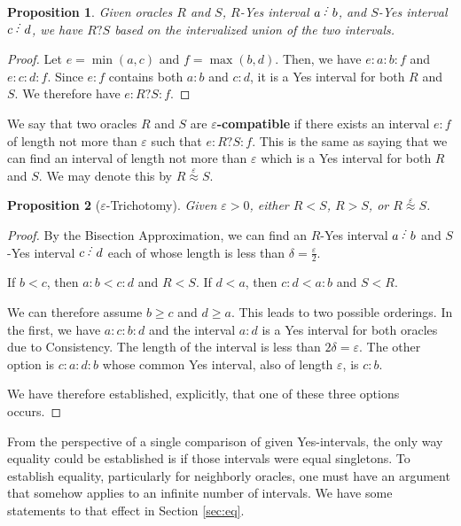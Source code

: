 \documentclass[12pt]{article}
\newtheorem{proposition}{Proposition}[subsection]
\begin{document}
\begin{proposition}
    Given oracles $R$ and $S$,  $R$-Yes interval $a\lte b$, and $S$-Yes interval $c\lte d$, we have $R ? S$ based on the intervalized union of the two intervals.  
\end{proposition}

\begin{proof}
Let $e= \min(a,c)$ and $f = \max(b,d)$. Then, we have $e:a:b:f$ and $e:c:d:f$. Since $e:f$ contains both $a:b$ and $c:d$, it is a Yes interval for both $R$ and $S$. We therefore have $e:R?S:f$.
\end{proof}

We say that two oracles $R$ and $S$ are \textbf{$\varepsilon$-compatible} if there exists an interval $e:f$ of length not more than $\varepsilon$ such that $e: R ? S : f$. This is the same as saying that we can find an interval of length not more than $\varepsilon$ which is a Yes interval for both $R$ and $S$. We may denote this by $R \overset{\varepsilon}{\approx} S$.


\begin{proposition}[$\varepsilon$-Trichotomy]\label{pr:tri}
Given $\varepsilon > 0$, either $R < S$,  $R > S$, or $R \overset{\varepsilon}{\approx} S$.
\end{proposition}


\begin{proof}
    By the Bisection Approximation, we can find an $R$-Yes interval $a \lte b$ and $S$-Yes interval $c \lte d$ each of whose length is less than $\delta = \frac{\varepsilon}{2}$. 

     If $b < c$, then $a:b < c:d$ and $R < S$. If $d < a$, then $c:d < a:b$ and $S < R$. 


     We can therefore assume $b \geq c$ and $d \geq a$. This leads to two possible orderings. In the first, we have $a:c:b:d$ and the interval $a:d$ is a Yes interval for both oracles due to Consistency. The length of the interval is less than $2 \delta = \varepsilon$. The other option is $c:a:d:b$ whose common Yes interval, also of length $\varepsilon$, is $c:b$. 

     We have therefore established, explicitly, that one of these three options occurs. 
     
\end{proof}

From the perspective of a single comparison of given Yes-intervals, the only way equality could be established is if those intervals were equal singletons. To establish equality, particularly for neighborly oracles, one must have an argument that somehow applies to an infinite number of intervals. We have some statements to that effect in Section \ref{sec:eq}. 
\end{document}
